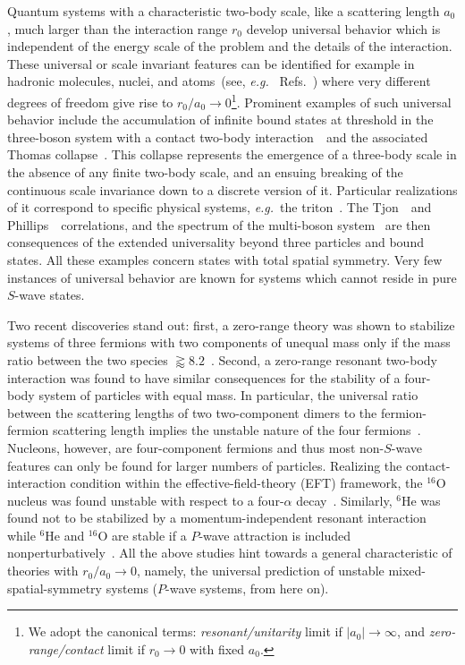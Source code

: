 \documentclass[onecolumn,preprint,superscriptaddress,nofootinbib]{revtex4-1}
\newcommand{\eg}{\textit{e.g.}~}
\begin{document}
Quantum systems with a characteristic two-body scale, like a scattering length $a_0$, much larger than the interaction range $r_0$
develop universal behavior which is independent of the energy scale of the problem and
the details of the interaction.
These universal or scale invariant features can be identified for example in
hadronic molecules, nuclei, and atoms~(see, \eg
Refs.~\cite{Tornqvist:1991ks,Voloshin:2003nt,Braaten:2003he,philli,tjon,PhysRevLett.81.69}) 
where very different degrees of freedom give rise to $r_0/a_0\to 0$\footnote{We adopt the canonical terms: {\it resonant/unitarity} limit
if $|a_0|\to\infty$, and {\it zero-range/contact} limit if $r_0\to0$ with fixed $a_0$.}.
Prominent examples of such universal behavior include the accumulation of infinite bound states at threshold in the three-boson system with a contact two-body interaction~\cite{Efimov:1971zz}~and the associated Thomas collapse~\cite{PhysRev.47.903}.
This collapse represents the emergence of a three-body scale in the absence of any finite two-body scale, and an ensuing breaking of the continuous scale invariance down to a discrete version of it.
Particular realizations of it correspond to specific physical systems, \eg the triton~\cite{Bedaque:1998kg}.
The Tjon~\cite{tjon}~and Phillips~\cite{philli}~correlations, and the spectrum of the multi-boson system~\cite{manybosons} are then consequences of the extended universality beyond three particles and bound states.
All these examples concern states with total spatial symmetry. Very few instances of universal behavior are known for systems which cannot reside in pure $S$-wave states.

Two recent discoveries stand out: 
first, a zero-range theory was shown to stabilize systems of three 
fermions with two components of unequal mass only
if the mass ratio between the two species $\gtrapprox8.2$~\cite{Kartavtsev_2007}.
Second, a zero-range resonant two-body interaction was found to have similar consequences for the stability of a four-body system of particles with equal mass. 
In particular, the universal ratio between the scattering lengths of
two two-component dimers to the fermion-fermion scattering length
implies the unstable nature of the four fermions~\cite{petrov_dimerov, Petrov:2005zz,PhysRevA.92.053624}.
Nucleons, however, are four-component fermions and thus most non-$S$-wave features can only be found for
larger numbers of particles.
Realizing the contact-interaction condition within the effective-field-theory (EFT) framework,
the $^{16}$O nucleus was found unstable with respect to a four-$\alpha$ decay~\cite{Contessi:2017rww}.
Similarly, $^{6}$He was found not to be stabilized by a momentum-independent resonant interaction
while $^{6}$He and $^{16}$O are stable if a $P$-wave attraction is included nonperturbatively~\cite{Gattobigio:2019omi, PhysRevC.98.054301}.
All the above studies hint towards a general characteristic of theories with $r_0/a_0\rightarrow 0$, namely,
the universal prediction of unstable mixed-spatial-symmetry systems ($P$-wave systems, from here on).
\end{document}
